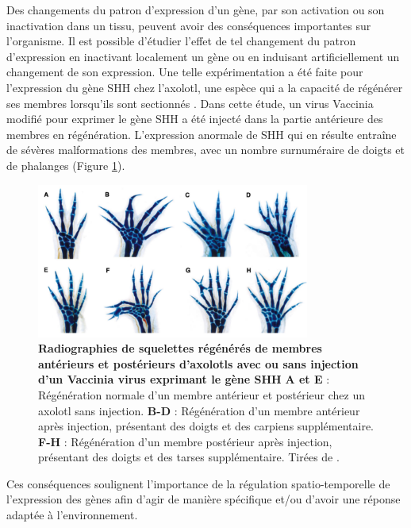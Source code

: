 Des changements du patron d’expression d’un gène, par son activation ou son inactivation dans un tissu, peuvent avoir des conséquences importantes sur l’organisme. Il est possible d'étudier l’effet de tel changement du patron d’expression en inactivant localement un gène ou en induisant artificiellement un changement de son expression. Une telle expérimentation a été faite pour l’expression du gène \acrshort{SHH} chez l’axolotl, une espèce qui a la capacité de régénérer ses membres lorsqu’ils sont sectionnés \citep{roy_vaccinia_2000}. Dans cette étude, un virus Vaccinia modifié pour exprimer le gène \acrshort{SHH} a été injecté dans la partie antérieure des membres en régénération. L’expression anormale de \acrshort{SHH} qui en résulte entraîne de sévères malformations des membres, avec un nombre surnuméraire de doigts et de phalanges (Figure \ref{fig:Fig3}). \\

\begin{figure}[h]
    \centering
    \includegraphics[width=0.8\textwidth, page=1] {figures/introduction/fig3.png}
    \caption[Radiographies de squelettes régénérés de membres antérieurs et postérieurs d'axolotls avec ou sans injection d'un Vaccinia virus exprimant le gène \acrshort{SHH}.]{
    \textbf{Radiographies de squelettes régénérés de membres antérieurs et postérieurs d'axolotls avec ou sans injection d'un Vaccinia virus exprimant le gène \acrshort{SHH}} \textbf{A et E} :  Régénération normale d'un membre antérieur et postérieur chez un axolotl sans injection. \textbf{B-D} :  Régénération d'un membre antérieur après injection, présentant des doigts et des carpiens supplémentaire. \textbf{F-H} : Régénération d'un membre postérieur après injection, présentant des doigts et des tarses supplémentaire. Tirées de \citep{roy_vaccinia_2000}.\\
    }
    \label{fig:Fig3}
\end{figure} 

Ces conséquences soulignent l’importance de la régulation spatio-temporelle de l’expression des gènes afin d'agir de manière spécifique et/ou d’avoir une réponse adaptée à l’environnement.
